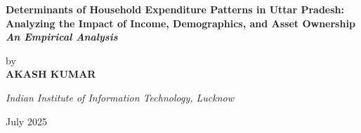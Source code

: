 \documentclass[12pt, a4paper, twoside]{book}
\begin{document}
\sloppy


\begin{titlepage}
    \centering
    \vspace*{2.5cm} %
    {\Huge\bfseries \centering Determinants of Household Expenditure Patterns in Uttar Pradesh: Analyzing the Impact of Income, Demographics, and Asset Ownership\\[1em] \textit{An Empirical Analysis} \\[3em]} %

    {\Large \centering by \\[3em]}
{\textbf{\centering AKASH KUMAR} \\[2em]} %

    {\Large \centering \textit{Indian Institute of Information Technology, Lucknow} \\[3em]} %

    {\large \centering July 2025} %

    \vfill
\end{titlepage}
\restoregeometry

\pagestyle{plain}




\pagestyle{plain} 

\tableofcontents
\listoftables 
\cleardoublepage

\mainmatter

\setcounter{page}{1}
\def\thepage{\arabic{page}}


 

 
 



\printbibliography[heading=bibintoc,title={References}]
\end{document}
